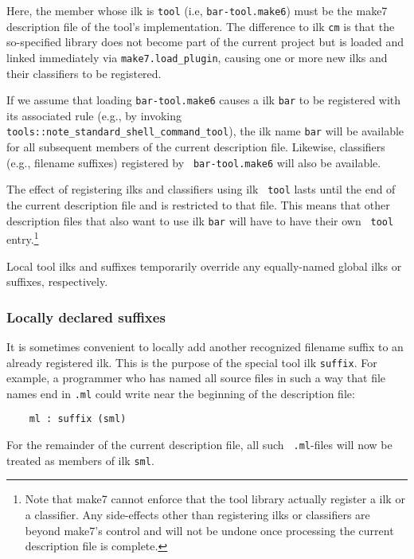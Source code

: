 Here, the member whose ilk is {\tt tool} (i.e, {\tt bar-tool.make6})
must be the make7 description file of the tool's implementation.  The
difference to ilk {\tt cm} is that the so-specified library does not
become part of the current project but is loaded and linked
immediately via {\tt make7.load\_plugin}, causing one or more new ilks
and their classifiers to be registered.

If we assume that loading {\tt bar-tool.make6} causes a ilk {\tt bar}
to be registered with its associated rule (e.g., by invoking {\tt
tools::note_standard_shell_command_tool}), the ilk name {\tt bar} will be
available for all subsequent members of the current description file.
Likewise, classifiers (e.g., filename suffixes) registered by {\tt
bar-tool.make6} will also be available.

The effect of registering ilks and classifiers using ilk {\tt
tool} lasts until the end of the current description file and is
restricted to that file.  This means that other description files that
also want to use ilk {\tt bar} will have to have their own {\tt
tool} entry.\footnote{Note that make7 cannot enforce that the tool
library actually register a ilk or a classifier.  Any side-effects
other than registering ilks or classifiers are beyond make7's control
and will not be undone once processing the current description file is
complete.}

Local tool ilks and suffixes temporarily override any equally-named
global ilks or suffixes, respectively.

\subsubsection{Locally declared suffixes}
\label{sec:localsuffixes}

It is sometimes convenient to locally add another recognized filename
suffix to an already registered ilk.  This is the purpose of the
special tool ilk {\tt suffix}.  For example, a programmer who has
named all source files in such a way that file names end in {\tt .ml}
could write near the beginning of the description file:

\begin{verbatim}
    ml : suffix (sml)
\end{verbatim}

For the remainder of the current description file, all such {\tt
.ml}-files will now be treated as members of ilk {\tt sml}.
